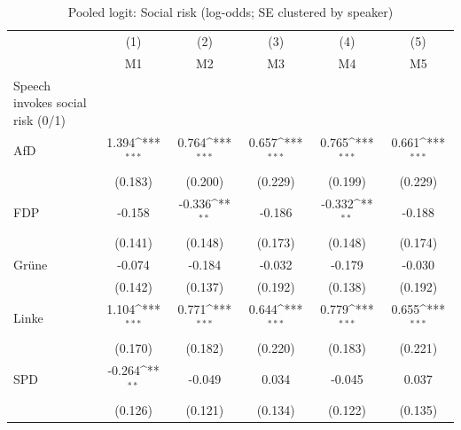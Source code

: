 \begin{table}[htbp]\centering
\def\sym#1{\ifmmode^{#1}\else\(^{#1}\)\fi}
\caption{Pooled logit: Social risk (log-odds; SE clustered by speaker)}
\begin{tabular}{l*{5}{c}}
\toprule
                    &\multicolumn{1}{c}{(1)}&\multicolumn{1}{c}{(2)}&\multicolumn{1}{c}{(3)}&\multicolumn{1}{c}{(4)}&\multicolumn{1}{c}{(5)}\\
                    &\multicolumn{1}{c}{M1}&\multicolumn{1}{c}{M2}&\multicolumn{1}{c}{M3}&\multicolumn{1}{c}{M4}&\multicolumn{1}{c}{M5}\\
\midrule
Speech invokes social risk (0/1)&                     &                     &                     &                     &                     \\
AfD                 &       1.394\sym{***}&       0.764\sym{***}&       0.657\sym{***}&       0.765\sym{***}&       0.661\sym{***}\\
                    &     (0.183)         &     (0.200)         &     (0.229)         &     (0.199)         &     (0.229)         \\
\addlinespace
FDP                 &      -0.158         &      -0.336\sym{**} &      -0.186         &      -0.332\sym{**} &      -0.188         \\
                    &     (0.141)         &     (0.148)         &     (0.173)         &     (0.148)         &     (0.174)         \\
\addlinespace
Grüne               &      -0.074         &      -0.184         &      -0.032         &      -0.179         &      -0.030         \\
                    &     (0.142)         &     (0.137)         &     (0.192)         &     (0.138)         &     (0.192)         \\
\addlinespace
Linke               &       1.104\sym{***}&       0.771\sym{***}&       0.644\sym{***}&       0.779\sym{***}&       0.655\sym{***}\\
                    &     (0.170)         &     (0.182)         &     (0.220)         &     (0.183)         &     (0.221)         \\
\addlinespace
SPD                 &      -0.264\sym{**} &      -0.049         &       0.034         &      -0.045         &       0.037         \\
                    &     (0.126)         &     (0.121)         &     (0.134)         &     (0.122)         &     (0.135)         \\

\end{tabular}
\end{table}
